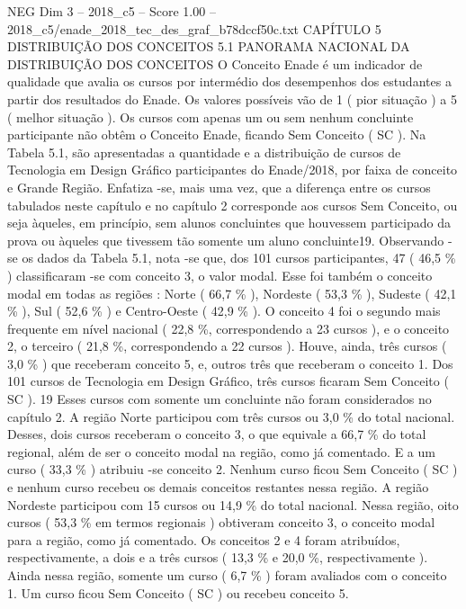 \begin{textsample}{NEG Dim 3 – 2018\_c5 – Score 1.00 – 2018\_c5/enade\_2018\_tec\_des\_graf\_b78dccf50c.txt}  \label{ex:f3_neg_097}
CAPÍTULO 5 DISTRIBUIÇÃO DOS CONCEITOS 5.1 PANORAMA NACIONAL DA DISTRIBUIÇÃO DOS CONCEITOS O Conceito Enade é um indicador de qualidade que avalia os cursos por intermédio dos desempenhos dos estudantes a partir dos resultados do Enade.
Os valores possíveis vão de 1 ( pior situação ) a 5 ( melhor situação ).
Os cursos com apenas um ou sem nenhum concluinte participante não obtêm o Conceito Enade, ficando Sem Conceito ( SC ).
Na Tabela 5.1, são apresentadas a quantidade e a distribuição de cursos de Tecnologia em Design Gráfico participantes do Enade/2018, por faixa de conceito e Grande Região.
Enfatiza -se, mais uma vez, que a diferença entre os cursos tabulados neste capítulo e no capítulo 2 corresponde aos cursos Sem Conceito, ou seja àqueles, em princípio, sem alunos concluintes que houvessem participado da prova ou àqueles que tivessem tão somente um aluno concluinte19.
Observando -se os dados da Tabela 5.1, nota -se que, dos 101 cursos participantes, 47 ( 46,5 \% ) classificaram -se com conceito 3, o valor modal.
Esse foi também o conceito modal em todas as regiões : Norte ( 66,7 \% ), Nordeste ( 53,3 \% ), Sudeste ( 42,1 \% ), Sul ( 52,6 \% ) e Centro-Oeste ( 42,9 \% ).
O conceito 4 foi o segundo mais frequente em nível nacional ( 22,8 \%, correspondendo a 23 cursos ), e o conceito 2, o terceiro ( 21,8 \%, correspondendo a 22 cursos ).
Houve, ainda, três cursos ( 3,0 \% ) que receberam conceito 5, e, outros três que receberam o conceito 1.
Dos 101 cursos de Tecnologia em Design Gráfico, três cursos ficaram Sem Conceito ( SC ). 19 Esses cursos com somente um concluinte não foram considerados no capítulo 2.
A região Norte participou com três cursos ou 3,0 \% do total nacional.
Desses, dois cursos receberam o conceito 3, o que equivale a 66,7 \% do total regional, além de ser o conceito modal na região, como já comentado.
E a um curso ( 33,3 \% ) atribuiu -se conceito 2.
Nenhum curso ficou Sem Conceito ( SC ) e nenhum curso recebeu os demais conceitos restantes nessa região.
A região Nordeste participou com 15 cursos ou 14,9 \% do total nacional.
Nessa região, oito cursos ( 53,3 \% em termos regionais ) obtiveram conceito 3, o conceito modal para a região, como já comentado.
Os conceitos 2 e 4 foram atribuídos, respectivamente, a dois e a três cursos ( 13,3 \% e 20,0 \%, respectivamente ).
Ainda nessa região, somente um curso ( 6,7 \% ) foram avaliados com o conceito 1.
Um curso ficou Sem Conceito ( SC ) ou recebeu conceito 5.

\end{textsample}
